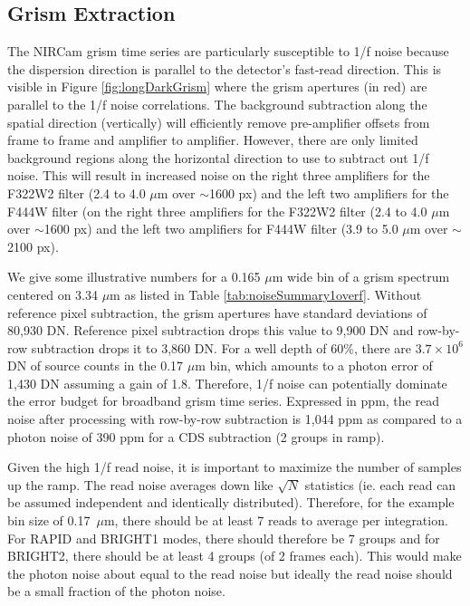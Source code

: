 \documentclass[]{aastex62}
\begin{document}
\subsection{Grism Extraction}\label{sec:GrismDarkExtraction}

The NIRCam grism time series are particularly susceptible to 1/f noise because the dispersion direction is parallel to the detector's fast-read direction.
This is visible in Figure \ref{fig:longDarkGrism} where the grism apertures (in red) are parallel to the 1/f noise correlations.
The background subtraction along the spatial direction (vertically) will efficiently remove pre-amplifier offsets from frame to frame and amplifier to amplifier.
However, there are only limited background regions along the horizontal direction to use to subtract out 1/f noise.
This will result in increased noise on the right three amplifiers for the F322W2 filter (2.4 to 4.0 $\mu$m over $\sim$1600 px) and the left two amplifiers for the F444W filter (on the right three amplifiers for the F322W2 filter (2.4 to 4.0 $\mu$m over $\sim$1600 px) and the left two amplifiers for F444W filter (3.9 to 5.0 $\mu$m over $\sim$2100 px).

We give some illustrative numbers for a 0.165 $\mu$m wide bin of a grism spectrum centered on 3.34 $\mu$m as listed in Table \ref{tab:noiseSummary1overf}.
Without reference pixel subtraction, the grism apertures have standard deviations of 80,930 DN.
Reference pixel subtraction drops this value to 9,900 DN and row-by-row subtraction drops it to 3,860 DN.
For a well depth of 60\%, there are $3.7 \times 10^6$ DN of source counts in the 0.17 $\mu$m bin, which amounts to a photon error of 1,430 DN assuming a gain of 1.8.
Therefore, 1/f noise can potentially dominate the error budget for broadband grism time series.
Expressed in ppm, the read noise after processing with row-by-row subtraction is 1,044 ppm as compared to a photon noise of 390 ppm for a CDS subtraction (2 groups in ramp).

Given the high 1/f read noise, it is important to maximize the number of samples up the ramp.
The read noise averages down like $\sqrt{N}$ statistics (ie. each read can be assumed independent and identically distributed).
Therefore, for the example bin size of 0.17~$\mu$m, there should be at least 7 reads to average per integration.
For RAPID and BRIGHT1 modes, there should therefore be 7 groups and for BRIGHT2, there should be at least 4 groups (of 2 frames each).
This would make the photon noise about equal to the read noise but ideally the read noise should be a small fraction of the photon noise.
\end{document}

